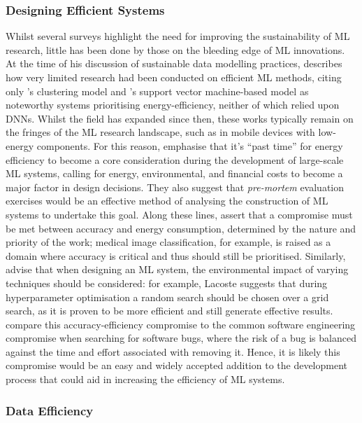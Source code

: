 \documentclass[a4paper, 12pt]{article}
\begin{document}
    \subsubsection{Designing Efficient Systems}

    Whilst several surveys highlight the need for improving the sustainability of ML research, little has been done by those on the bleeding edge of ML innovations. At the time of his discussion of sustainable data modelling practices,  describes how very limited research had been conducted on efficient ML methods, citing only 's clustering model and 's support vector machine-based model as noteworthy systems prioritising energy-efficiency, neither of which relied upon DNNs. Whilst the field has expanded since then, these works typically remain on the fringes of the ML research landscape, such as in mobile devices with low-energy components. For this reason,  emphasise that it's ``past time” for energy efficiency to become a core consideration during the development of large-scale ML systems, calling for energy, environmental, and financial costs to become a major factor in design decisions. They also suggest that \emph{pre-mortem} evaluation exercises \cite{klein-2008} would be an effective method of analysing the construction of ML systems to undertake this goal. Along these lines,  assert that a compromise must be met between accuracy and energy consumption, determined by the nature and priority of the work; medical image classification, for example, is raised as a domain where accuracy is critical and thus should still be prioritised. Similarly,  advise that when designing an ML system, the environmental impact of varying techniques should be considered: for example, Lacoste suggests that during hyperparameter optimisation a random search should be chosen over a grid search, as it is proven to be more efficient and still generate effective results.  compare this accuracy-efficiency compromise to the common software engineering compromise when searching for software bugs, where the risk of a bug is balanced against the time and effort associated with removing it. Hence, it is likely this compromise would be an easy and widely accepted addition to the development process that could aid in increasing the efficiency of ML systems. 

    \subsubsection{Data Efficiency}
\end{document}
